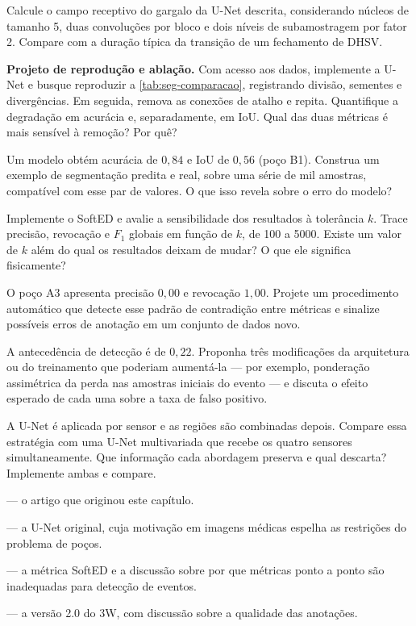 \begin{exercicios}
\item Calcule o campo receptivo do gargalo da U-Net descrita, considerando núcleos de
      tamanho 5, duas convoluções por bloco e dois níveis de subamostragem por fator 2.
      Compare com a duração típica da transição de um fechamento de DHSV.

\item \textbf{Projeto de reprodução e ablação.} Com acesso aos dados, implemente a U-Net
      e busque reproduzir a \cref{tab:seg-comparacao}, registrando divisão, sementes e
      divergências. Em seguida, remova as conexões de atalho e repita. Quantifique a
      degradação em acurácia e, separadamente, em IoU. Qual das duas métricas é mais
      sensível à remoção? Por quê?

\item Um modelo obtém acurácia de $0{,}84$ e IoU de $0{,}56$ (poço B1). Construa um
      exemplo de segmentação predita e real, sobre uma série de mil amostras, compatível
      com esse par de valores. O que isso revela sobre o erro do modelo?

\item Implemente o SoftED e avalie a sensibilidade dos resultados à tolerância $k$. Trace
      precisão, revocação e $F_1$ globais em função de $k$, de 100 a 5000. Existe um
      valor de $k$ além do qual os resultados deixam de mudar? O que ele significa
      fisicamente?

\item O poço A3 apresenta precisão $0{,}00$ e revocação $1{,}00$. Projete um procedimento
      automático que detecte esse padrão de contradição entre métricas e sinalize
      possíveis erros de anotação em um conjunto de dados novo.

\item A antecedência de detecção é de $0{,}22$. Proponha três modificações da arquitetura
      ou do treinamento que poderiam aumentá-la --- por exemplo, ponderação assimétrica
      da perda nas amostras iniciais do evento --- e discuta o efeito esperado de cada
      uma sobre a taxa de falso positivo.

\item A U-Net é aplicada por sensor e as regiões são combinadas depois. Compare essa
      estratégia com uma U-Net multivariada que recebe os quatro sensores
      simultaneamente. Que informação cada abordagem preserva e qual descarta? Implemente
      ambas e compare.
\end{exercicios}

\begin{leituras}
\item \citet{Lopes2026OTC} --- o artigo que originou este capítulo.
\item \citet{Ronneberger2015} --- a U-Net original, cuja motivação em imagens médicas
      espelha as restrições do problema de poços.
\item \citet{Salles2024softed} --- a métrica SoftED e a discussão sobre por que métricas
      ponto a ponto são inadequadas para detecção de eventos.
\item \citet{VazVargas2026_3w2} --- a versão 2.0 do 3W, com discussão sobre a qualidade das
      anotações.
\end{leituras}
